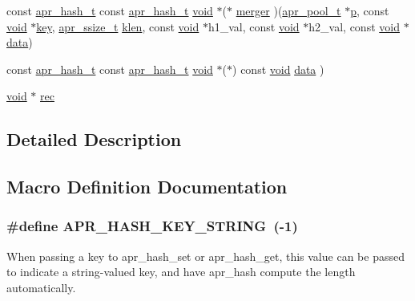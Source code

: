 \begin{DoxyCompactItemize}
const \hyperlink{structapr__hash__t}{apr\+\_\+hash\+\_\+t} const \hyperlink{structapr__hash__t}{apr\+\_\+hash\+\_\+t} \hyperlink{group__MOD__ISAPI_gacd6cdbf73df3d9eed42fa493d9b621a6}{void} $\ast$($\ast$ \hyperlink{group__apr__hash_gad1c391a8c7b3ceed50df7f2c5445e2e3}{merger} )(\hyperlink{structapr__pool__t}{apr\+\_\+pool\+\_\+t} $\ast$\hyperlink{group__APACHE__CORE__MPM_ga5cd91701e5c167f2b1a38e70ab57817e}{p}, const \hyperlink{group__MOD__ISAPI_gacd6cdbf73df3d9eed42fa493d9b621a6}{void} $\ast$\hyperlink{apr__siphash_8h_adac0b6a30345ea1d0daa8a692b0b7ad9}{key}, \hyperlink{group__apr__platform_ga215ebb88932bee220b766263ebbfe6fa}{apr\+\_\+ssize\+\_\+t} \hyperlink{apr__hash_8c_a2274d9ee336b1873447f6b5817beb856}{klen}, const \hyperlink{group__MOD__ISAPI_gacd6cdbf73df3d9eed42fa493d9b621a6}{void} $\ast$h1\+\_\+val, const \hyperlink{group__MOD__ISAPI_gacd6cdbf73df3d9eed42fa493d9b621a6}{void} $\ast$h2\+\_\+val, const \hyperlink{group__MOD__ISAPI_gacd6cdbf73df3d9eed42fa493d9b621a6}{void} $\ast$\hyperlink{structdata}{data})
\item 
const \hyperlink{structapr__hash__t}{apr\+\_\+hash\+\_\+t} const \hyperlink{structapr__hash__t}{apr\+\_\+hash\+\_\+t} \hyperlink{group__MOD__ISAPI_gacd6cdbf73df3d9eed42fa493d9b621a6}{void} $\ast$($\ast$) const \hyperlink{group__MOD__ISAPI_gacd6cdbf73df3d9eed42fa493d9b621a6}{void} \hyperlink{group__apr__hash_gac29b1ff61f790101fde32d55f857b7cc}{data} )
\item 
\hyperlink{group__MOD__ISAPI_gacd6cdbf73df3d9eed42fa493d9b621a6}{void} $\ast$ \hyperlink{group__apr__hash_ga7f7fc1dfc266c4a91490f3ecea7e39c9}{rec}
\end{DoxyCompactItemize}


\subsection{Detailed Description}


\subsection{Macro Definition Documentation}
\subsubsection[{\texorpdfstring{A\+P\+R\+\_\+\+H\+A\+S\+H\+\_\+\+K\+E\+Y\+\_\+\+S\+T\+R\+I\+NG}{APR_HASH_KEY_STRING}}]{\setlength{\rightskip}{0pt plus 5cm}\#define A\+P\+R\+\_\+\+H\+A\+S\+H\+\_\+\+K\+E\+Y\+\_\+\+S\+T\+R\+I\+NG~(-\/1)}\hypertarget{group__apr__hash_ga3ba32541f2717b394000f87f38c7e12d}{}\label{group__apr__hash_ga3ba32541f2717b394000f87f38c7e12d}
When passing a key to apr\+\_\+hash\+\_\+set or apr\+\_\+hash\+\_\+get, this value can be passed to indicate a string-\/valued key, and have apr\+\_\+hash compute the length automatically.

